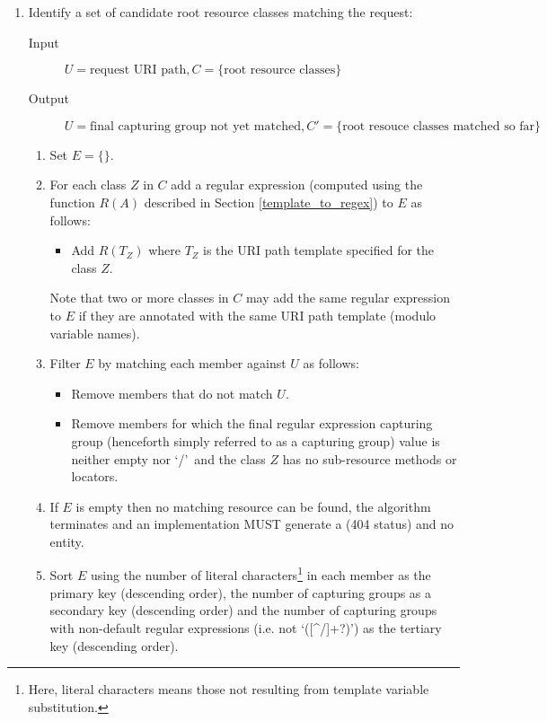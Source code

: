 \begin{enumerate}
\item Identify a set of candidate root resource classes matching the request:

\begin{description}
\item[Input]  $U=\mbox{request URI path},C=\{\mbox{root resource classes}\}$
\item[Output] $U=\mbox{final capturing group not yet matched}, C'=\{\mbox{root resouce classes matched so far}\}$
\end{description}

\begin{enumerate}
\item Set $E=\{\}$.

\item For each class $Z$ in $C$ add a regular expression (computed using the function $R(A)$ described in Section \ref{template_to_regex}) to $E$ as follows:
\begin{itemize}
\item\label{build_E} Add $R(T_Z)$ where $T_Z$ is the URI path template specified for the class $Z$.
\end{itemize}
Note that two or more classes in $C$ may add the same regular expression to $E$ if they are
annotated with the same URI path template (modulo variable names).

\item Filter $E$ by matching each member against $U$ as follows:
\begin{itemize}
\item Remove members that do not match $U$.
\item Remove members for which the final regular expression capturing group (henceforth simply referred to as a capturing group) value is neither empty nor \lq/\rq\ and the class $Z$ has no sub-resource methods or locators.
\end{itemize}

\item If $E$ is empty then no matching resource can be found, the algorithm terminates and an implementation MUST generate a  (404 status) and no entity. 

\item Sort $E$ using the number of literal characters\footnote{Here, literal characters means those not resulting from template variable substitution.} in each member as the primary key (descending order), the number of capturing groups as a secondary key (descending order) and the number of capturing groups with non-default regular expressions (i.e. not \lq([\^{ }/]+?)\rq) as the tertiary key (descending order).


\end{enumerate}
\end{enumerate}
